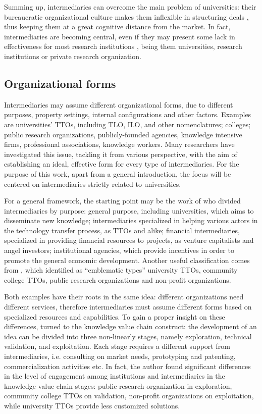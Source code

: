Summing up, intermediaries can overcome the main problem of universities: their bureaucratic organizational culture makes them inflexible in structuring deals \citep{Siegel2003a}, thus keeping them at a great cognitive distance from the market. In fact, intermediaries are becoming central, even if they may present some lack in effectiveness for most research institutions \citep{Geuna2009}, being them universities, research institutions or private research organization.

\subsection{Organizational forms}

Intermediaries may assume different organizational forms, due to different purposes, property settings, internal configurations and other factors. Examples are universities' TTOs, including TLO, ILO, and other nomenclatures; colleges; public research organizations, publicly-founded agencies, knowledge intensive firms, professional associations, knowledge workers. Many researchers have investigated this issue, tackling it from various perspective, with the aim of establishing an ideal, effective form for every type of intermediaries. For the purpose of this work, apart from a general introduction, the focus will be centered on intermediaries strictly related to universities.

For a general framework, the starting point may be the work of \citet{Yusuf2008} who divided intermediaries by purpose: general purpose, including universities, which aims to disseminate new knowledge; intermediaries specialized in helping various actors in the technology transfer process, as TTOs and alike; financial intermediaries, specialized in providing financial resources to projects, as venture capitalists and angel investors; institutional agencies, which provide incentives in order to promote the general economic development. Another useful classification comes from \citet{Landry2013}, which identified as \enquote{emblematic types} university TTOs, community college TTOs, public research organizations and non-profit organizations.

Both examples have their roots in the same idea: different organizations need different services, therefore intermediaries must assume different forms based on specialized resources and capabilities. To gain a proper insight on these differences, \citet{Landry2013} turned to the knowledge value chain construct: the development of an idea can be divided into three non-linearly stages, namely exploration, technical validation, and exploitation. Each stage requires a different support from intermediaries, i.e. consulting on market needs, prototyping and patenting, commercialization activities etc. In fact, the author found significant differences in the level of engagement among institutions and intermediaries in the knowledge value chain stages: public research organization in exploration, community college TTOs on validation, non-profit organizations on exploitation, while university TTOs provide less customized solutions.

